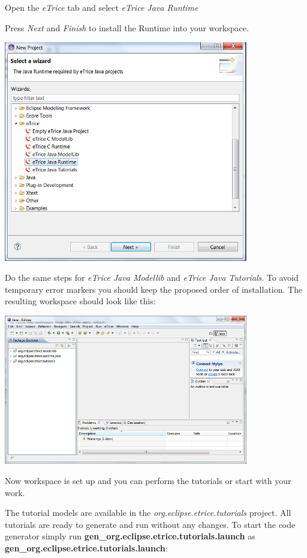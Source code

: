 Open the \textit{eTrice} tab and select \textit{eTrice Java Runtime}

Press \textit{Next} and \textit{Finish} to install the Runtime into your workspace.

\includegraphics[width=0.8\textwidth]{images/013-SetupWorkspace03.png}

Do the same steps for \textit{eTrice Java Modellib} and \textit{eTrice Java Tutorials}. To avoid temporary error markers you should keep the proposed order of installation. The resulting workspace should look like this:

\includegraphics[width=0.8\textwidth]{images/013-SetupWorkspace04.png}

Now workspace is set up and you can perform the tutorials or start with your work.

The tutorial models are available in the \textit{org.eclipse.etrice.tutorials} project. All tutorials are ready to generate and run without any changes. To start the code generator simply run \textbf{gen\_org.eclipse.etrice.tutorials.launch} as \textbf{gen\_org.eclipse.etrice.tutorials.launch}: 

